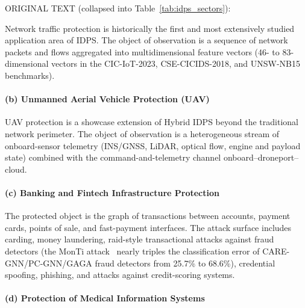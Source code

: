 \label{subsubsec:sector_nids}%
\label{subsubsec:sector_uav}%
\label{subsubsec:sector_fintech}%
\label{subsubsec:sector_medical}%
\label{subsubsec:sector_iiot}%
\label{subsubsec:sector_av}%
\label{subsubsec:sector_cloud}%

\iffalse
ORIGINAL TEXT (collapsed into Table~\ref{tab:idps_sectors}):

Network traffic protection is historically the first and most
extensively studied application area of IDPS. The object of
observation is a sequence of network packets and flows aggregated
into multidimensional feature vectors (46- to 83-dimensional vectors
in the CIC-IoT-2023, CSE-CICIDS-2018, and UNSW-NB15 benchmarks).

\paragraph{(b) Unmanned Aerial Vehicle Protection (UAV)}\label{subsubsec:sector_uav}

UAV protection is a showcase extension of Hybrid IDPS beyond the
traditional network perimeter. The object of observation is a
heterogeneous stream of onboard-sensor telemetry (INS/GNSS, LiDAR,
optical flow, engine and payload state) combined with the
command-and-telemetry channel onboard--droneport--cloud.

\paragraph{(c) Banking and Fintech Infrastructure Protection}\label{subsubsec:sector_fintech}

The protected object is the graph of transactions between accounts,
payment cards, points of sale, and fast-payment interfaces. The
attack surface includes carding, money laundering, raid-style
transactional attacks against fraud detectors (the
MonTi attack~\cite{MonTi2025} nearly triples the classification
error of CARE-GNN/PC-GNN/GAGA fraud detectors from 25.7\% to 68.6\%),
credential spoofing, phishing, and attacks against credit-scoring
systems.

\paragraph{(d) Protection of Medical Information Systems}\label{subsubsec:sector_medical}

